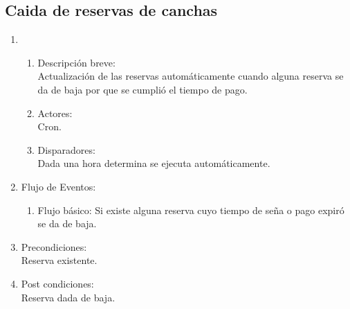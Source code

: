 \documentclass[a4paper,11pt]{article}
\begin{document}
\subsection{Caida de reservas de canchas}
\begin{enumerate}

        \item
	\begin{enumerate}
            \item Descripci\'on breve: \\
                Actualizaci\'on de las reservas autom\'aticamente cuando alguna reserva
                se da de baja por que se cumpli\'o el tiempo de pago.
            \item Actores: \\
                Cron.
            \item Disparadores: \\
                Dada una hora determina se ejecuta autom\'aticamente.
        \end{enumerate}

        \item Flujo de Eventos: 

        \begin{enumerate}
            \item Flujo b\'asico:
                Si existe alguna reserva cuyo tiempo de se\~na o pago expir\'o se da de baja.
        \end{enumerate}

        \item Precondiciones: \\
            Reserva existente.

        \item Post condiciones: \\
            Reserva dada de baja.

\end{enumerate}

\end{document}
